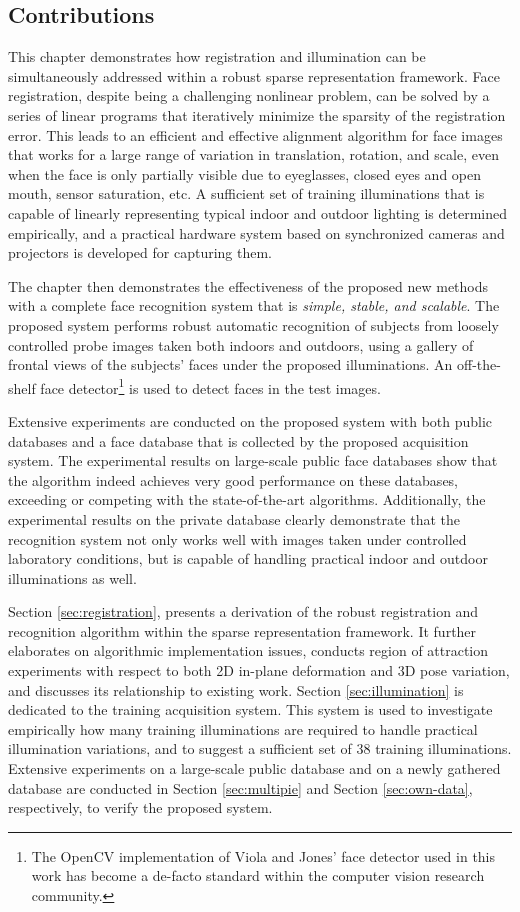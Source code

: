 \subsection{Contributions} This chapter demonstrates how registration and
illumination can be simultaneously addressed within a robust sparse
representation framework. Face registration, despite being a challenging
nonlinear problem, can be solved by a series of linear programs that
iteratively minimize the sparsity of the registration error. This leads to an
efficient and effective alignment algorithm for face images that works for a
large range of variation in translation, rotation, and scale, even when the
face is only partially visible due to eyeglasses, closed eyes and open mouth,
sensor saturation, etc.  A sufficient set of training illuminations that is
capable of linearly representing typical indoor and outdoor lighting is
determined empirically, and a practical hardware system based on synchronized
cameras and projectors is developed for capturing them.

The chapter then demonstrates the effectiveness of the proposed new
methods with a complete face recognition system that is {\em
simple, stable, and scalable}. The proposed system performs
robust automatic recognition of subjects from loosely
controlled probe images taken both indoors and outdoors,
using a gallery of
frontal views of the subjects' faces under the proposed
illuminations. An off-the-shelf face
detector\footnote{The OpenCV
implementation of Viola and Jones' face detector
\cite{Viola2004-IJCV} used in this work has become a de-facto standard
within the computer vision research community.} is used to detect faces in the test images.

Extensive experiments are conducted on the proposed system with
both public databases and a face database that is collected by
the proposed acquisition system. The experimental results on
large-scale public face databases show that the algorithm
indeed achieves very good performance on these databases,
exceeding or competing with the state-of-the-art algorithms.
Additionally, the experimental results on the private database
clearly demonstrate that the recognition system not only works well with
images taken under controlled laboratory conditions, but is
capable of handling practical indoor and outdoor illuminations as well.

 Section \ref{sec:registration},
presents a derivation of the robust registration and recognition algorithm within the sparse
representation framework. It further elaborates on algorithmic implementation issues,
conducts region of attraction experiments with respect to both 2D in-plane
deformation and 3D pose variation, and discusses its relationship to existing
work. Section \ref{sec:illumination} is dedicated to the training acquisition
system. This system is used to investigate empirically how many training
illuminations are required to handle practical illumination variations, and to
suggest a sufficient set of 38 training illuminations. Extensive experiments on
a large-scale public database and on a newly gathered database are conducted in Section
\ref{sec:multipie} and Section \ref{sec:own-data}, respectively, to verify the
proposed system. 


